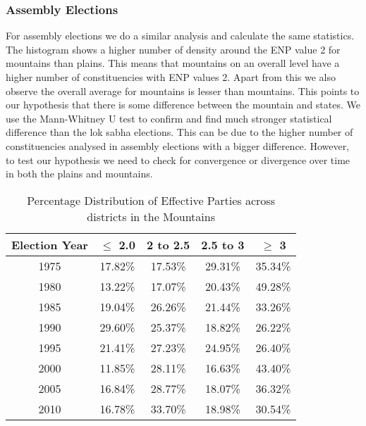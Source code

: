 \subsubsection{Assembly Elections}
For assembly elections we do a similar analysis and calculate the same statistics. The histogram shows a higher number of density around the ENP value 2 for mountains than plains. This means that mountains on an overall level have a higher number of constituencies with ENP values 2. Apart from this we also observe the overall average for mountains is lesser than mountains. This points to our hypothesis that there is some difference between the mountain and states. We use the Mann-Whitney U test to confirm and find much stronger statistical difference than the lok sabha elections. This can be due to the higher number of constituencies analysed in assembly elections with a bigger difference. However, to test our hypothesis we need to check for convergence or divergence over time in both the plains and mountains. 

\begin{table}[h]
    \centering
    \begin{tabular}{|c|c|c|c|c|}
    \hline
    Election Year & $\leq$ 2.0 & 2 to 2.5 & 2.5 to 3 & $\geq$ 3 \\ \hline
    1975 & 17.82\% & 17.53\% & 29.31\% & 35.34\% \\ \hline
    1980 & 13.22\% & 17.07\% & 20.43\% & 49.28\% \\ \hline
    1985 & 19.04\% & 26.26\% & 21.44\% & 33.26\% \\ \hline
    1990 & 29.60\% & 25.37\% & 18.82\% & 26.22\% \\ \hline
    1995 & 21.41\% & 27.23\% & 24.95\% & 26.40\% \\ \hline
    2000 & 11.85\% & 28.11\% & 16.63\% & 43.40\% \\ \hline
    2005 & 16.84\% & 28.77\% & 18.07\% & 36.32\% \\ \hline
    2010 & 16.78\% & 33.70\% & 18.98\% & 30.54\% \\ \hline
    \end{tabular}
    \caption{Percentage Distribution of Effective Parties across districts in the Mountains}
    \label{tab:assembly_mountain_percentage_district}
    \end{table}

